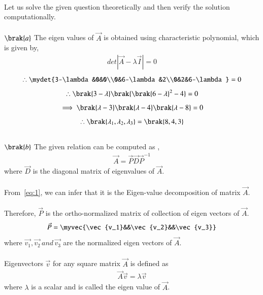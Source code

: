 \documentclass[journal]{IEEEtran}
\begin{document}
\solution \\
Let us solve the given question theoretically and then verify the solution computationally.\\
\\
$\brak{a}$ The eigen values of $\vec{A}$ is obtained using characteristic polynomial, which is given by,
\begin{align}
    det|\vec{A}-\lambda\vec{I}|=0
\end{align}
\begin{align}
    \therefore \mydet{3-\lambda&0&0\\0&6-\lambda&2\\0&2&6-\lambda}=0
\end{align}
\begin{align}
    \therefore \brak{3-\lambda}\brak{\brak{6-\lambda}^2-4}=0
\end{align}
\begin{align}
    \implies  \brak{\lambda-3}\brak{\lambda-4}\brak{\lambda-8}=0
\end{align}
\newpage
\vspace*{0.25cm}
\begin{align}
    \therefore \brak{\lambda_1,\lambda_2,\lambda_3}=\brak{8,4,3}
\end{align}
\\
$\brak{b}$ The given relation can be computed as ,
\begin{align}
    \vec{A}=\vec{P}\vec{D}\vec{P}^{-1} \label{eq:1}
\end{align}
where $\vec{D}$ is the diagonal matrix of eigenvalues of $\vec{A}$.\\
\\
From~\eqref{eq:1}, we can infer that it is the Eigen-value decomposition of matrix $\vec{A}$.\\
\\
Therefore, $\vec{P}$ is the ortho-normalized matrix of collection of eigen vectors of $\vec{A}$.
\begin{align}
    \vec{P}=\myvec{\vec{v_1}&&\vec{v_2}&&\vec{v_3}}
\end{align}
where $\vec{v_1},\vec{v_2} \,and\, \vec{v_3}$ are the normalized eigen vectors of $\vec{A}$.\\
\\
Eigenvectors $\vec{v}$ for any square matrix $\vec{A}$ is defined as 
\begin{align}
    \vec{A}\vec{v}=\lambda\vec{v}
\end{align}
where $\lambda$ is a scalar and is called the eigen value of $\vec{A}$.\\
\end{document}
